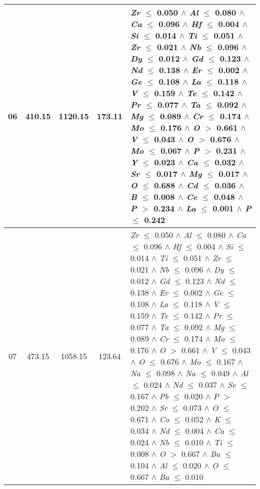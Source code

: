 \begin{table}[!htbp]
\begin{tabular}{ccccm{}}
		\hline
		06 & 410.15 & 1120.15 & 173.11 & \textit{Zr} $\le$ 0.050 $\wedge$ \textit{Al} $\le$ 0.080 $\wedge$ \textit{Ca} $\le$ 0.096 $\wedge$ \textit{Hf} $\le$ 0.004 $\wedge$ \textit{Si} $\le$ 0.014 $\wedge$ \textit{Ti} $\le$ 0.051 $\wedge$ \textit{Zr} $\le$ 0.021 $\wedge$ \textit{Nb} $\le$ 0.096 $\wedge$ \textit{Dy} $\le$ 0.012 $\wedge$ \textit{Gd} $\le$ 0.123 $\wedge$ \textit{Nd} $\le$ 0.138 $\wedge$ \textit{Er} $\le$ 0.002 $\wedge$ \textit{Ge} $\le$ 0.108 $\wedge$ \textit{La} $\le$ 0.118 $\wedge$ \textit{V} $\le$ 0.159 $\wedge$ \textit{Te} $\le$ 0.142 $\wedge$ \textit{Pr} $\le$ 0.077 $\wedge$ \textit{Ta} $\le$ 0.092 $\wedge$ \textit{Mg} $\le$ 0.089 $\wedge$ \textit{Cr} $\le$ 0.174 $\wedge$ \textit{Mo} $\le$ 0.176 $\wedge$ \textit{O} $>$ 0.661 $\wedge$ \textit{V} $\le$ 0.043 $\wedge$ \textit{O} $>$ 0.676 $\wedge$ \textit{Mo} $\le$ 0.067 $\wedge$ \textit{P} $>$ 0.231 $\wedge$ \textit{Y} $\le$ 0.023 $\wedge$ \textit{Ca} $\le$ 0.032 $\wedge$ \textit{Sr} $\le$ 0.017 $\wedge$ \textit{Mg} $\le$ 0.017 $\wedge$ \textit{O} $\le$ 0.688 $\wedge$ \textit{Cd} $\le$ 0.036 $\wedge$ \textit{B} $\le$ 0.008 $\wedge$ \textit{Ce} $\le$ 0.048 $\wedge$ \textit{P} $>$ 0.234 $\wedge$ \textit{La} $\le$ 0.001 $\wedge$ \textit{P} $\le$ 0.242\\
		\hline
		07 & 473.15 & 1058.15 & 123.64 & \textit{Zr} $\le$ 0.050 $\wedge$ \textit{Al} $\le$ 0.080 $\wedge$ \textit{Ca} $\le$ 0.096 $\wedge$ \textit{Hf} $\le$ 0.004 $\wedge$ \textit{Si} $\le$ 0.014 $\wedge$ \textit{Ti} $\le$ 0.051 $\wedge$ \textit{Zr} $\le$ 0.021 $\wedge$ \textit{Nb} $\le$ 0.096 $\wedge$ \textit{Dy} $\le$ 0.012 $\wedge$ \textit{Gd} $\le$ 0.123 $\wedge$ \textit{Nd} $\le$ 0.138 $\wedge$ \textit{Er} $\le$ 0.002 $\wedge$ \textit{Ge} $\le$ 0.108 $\wedge$ \textit{La} $\le$ 0.118 $\wedge$ \textit{V} $\le$ 0.159 $\wedge$ \textit{Te} $\le$ 0.142 $\wedge$ \textit{Pr} $\le$ 0.077 $\wedge$ \textit{Ta} $\le$ 0.092 $\wedge$ \textit{Mg} $\le$ 0.089 $\wedge$ \textit{Cr} $\le$ 0.174 $\wedge$ \textit{Mo} $\le$ 0.176 $\wedge$ \textit{O} $>$ 0.661 $\wedge$ \textit{V} $\le$ 0.043 $\wedge$ \textit{O} $\le$ 0.676 $\wedge$ \textit{Mo} $\le$ 0.167 $\wedge$ \textit{Na} $\le$ 0.098 $\wedge$ \textit{Na} $\le$ 0.049 $\wedge$ \textit{Al} $\le$ 0.024 $\wedge$ \textit{Nd} $\le$ 0.037 $\wedge$ \textit{Se} $\le$ 0.167 $\wedge$ \textit{Pb} $\le$ 0.020 $\wedge$ \textit{P} $>$ 0.202 $\wedge$ \textit{Sr} $\le$ 0.073 $\wedge$ \textit{O} $\le$ 0.671 $\wedge$ \textit{Co} $\le$ 0.052 $\wedge$ \textit{K} $\le$ 0.034 $\wedge$ \textit{Nd} $\le$ 0.004 $\wedge$ \textit{Ca} $\le$ 0.024 $\wedge$ \textit{Nb} $\le$ 0.010 $\wedge$ \textit{Ti} $\le$ 0.008 $\wedge$ \textit{O} $>$ 0.667 $\wedge$ \textit{Ba} $\le$ 0.104 $\wedge$ \textit{Al} $\le$ 0.020 $\wedge$ \textit{O} $\le$ 0.667 $\wedge$ \textit{Ba} $\le$ 0.010\\

\end{tabular}
\end{table}
